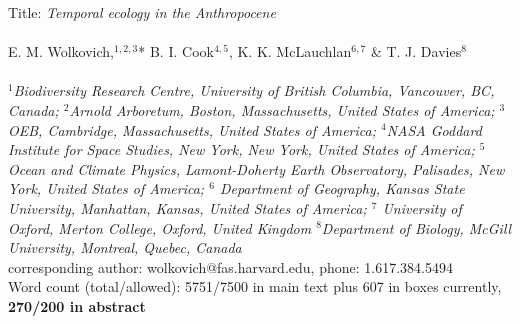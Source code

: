 \documentclass[11pt,a4paper,oneside]{article}
\begin{document}


\noindent Title: \emph{Temporal ecology in the Anthropocene}\\
\\
\noindent E. M. Wolkovich,$^{1,2,3}$* B. I. Cook$^{4,5}$, K. K. McLauchlan$^{6,7}$ \& T. J. Davies$^{8}$\\
\\
\noindent \emph{$^{1}$Biodiversity Research Centre, University of British Columbia, Vancouver, BC, Canada; $^{2}$Arnold Arboretum, Boston, Massachusetts, United States of America; $^{3}$OEB, Cambridge, Massachusetts, United States of America; $^{4}$NASA Goddard Institute for Space Studies, New York, New York, United States of America; $^{5}$Ocean and Climate  Physics, Lamont-Doherty Earth Observatory, Palisades, New York, United States of America; $^{6}$ Department of Geography, Kansas State University, Manhattan, Kansas, United States of America; $^{7}$ University of Oxford, Merton College, Oxford, United Kingdom $^{8}$Department of Biology, McGill University, Montreal, Quebec, Canada}\\ %

\noindent *corresponding author: wolkovich@fas.harvard.edu, phone: 1.617.384.5494\\

\noindent Word count (total/allowed): 5751/7500 in main text plus 607 in boxes currently, {\bf 270/200 in abstract} %

\end{document}
